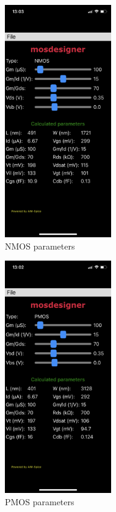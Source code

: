    
\begin{figure}[ht]
\centering
    \begin{subfigure}{.33\textwidth}
        \centering
        \includegraphics[height = 10cm, keepaspectratio]{Images/mosdesigner/NMOS_parameters.PNG}
        \caption{NMOS parameters}
        \label{fig:NMOS:param}
    \end{subfigure}%
    \begin{subfigure}{.33\textwidth}
        \centering
        \includegraphics[height = 10cm, keepaspectratio]{Images/mosdesigner/PMOS_parameters.PNG}
        \caption{PMOS parameters}
        \label{fig:PMOS:param}
    \end{subfigure}%
    \begin{subfigure}{.33\textwidth}

\end{subfigure}
\end{figure}
